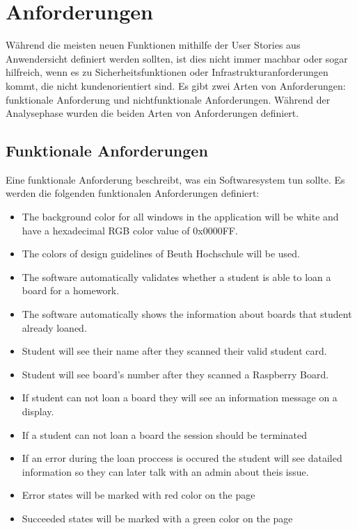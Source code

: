 \section{Anforderungen}
\label{sec:design:req}
Während die meisten neuen Funktionen mithilfe der User Stories aus Anwendersicht definiert werden sollten, ist dies nicht immer machbar oder sogar hilfreich, wenn es zu Sicherheitsfunktionen oder Infrastrukturanforderungen kommt, die nicht kundenorientiert sind. Es gibt zwei Arten von Anforderungen: funktionale Anforderung und nichtfunktionale Anforderungen. Während der Analysephase wurden die beiden Arten von Anforderungen definiert. 

\subsection{Funktionale Anforderungen}
Eine funktionale Anforderung beschreibt, was ein Softwaresystem tun sollte. Es werden die folgenden funktionalen Anforderungen definiert:
\label{sec:design:req:func}
\begin{itemize}
	\itemsep-1.2em 
	\item The background color for all windows in the application will be white and have a hexadecimal RGB color value of 0x0000FF.
	\item The colors of design guidelines of Beuth Hochschule will be used.
	\item The software automatically validates whether a student is able to loan a board for a homework.
	\item The software automatically shows the information about boards that student already loaned.
	\item Student will see their name after they scanned their valid student card.
	\item Student will see board's number after they scanned a Raspberry Board.
	\item If student can not loan a board they will see an information message on a display.
	\item If a student can not loan a board the session should be terminated
	\item If an error during the loan proccess is occured the student will see datailed information so they can later talk with an admin about theis issue.
	\item Error states will be marked with red color on the page
	\item Succeeded states will be marked with a green color on the page
\end{itemize}

